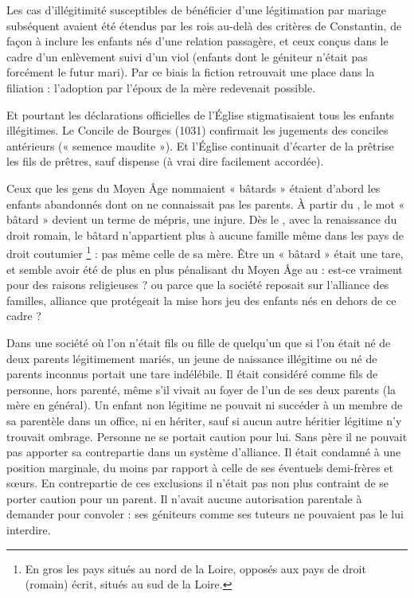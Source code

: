  Les cas d'illégitimité susceptibles de bénéficier d'une légitimation par mariage subséquent avaient été étendus par les rois au-delà des critères de Constantin, de façon à inclure les enfants nés d'une relation passagère, et ceux conçus dans le cadre d'un enlèvement suivi d'un viol (enfants dont le géniteur n'était pas forcément le futur mari). Par ce biais la fiction retrouvait une place dans la filiation : l'adoption par l'époux de la mère redevenait possible. 

 Et pourtant les déclarations officielles de l'Église stigmatisaient tous les enfants illégitimes. Le Con\-ci\-le de Bourges (1031) confirmait les jugements des conciles antérieurs (« semence maudite »). Et l'Église continuait d'écarter de la prêtrise les fils de prêtres, sauf dispense (à vrai dire facilement accordée). 



 Ceux que les gens du Moyen Âge nommaient « bâtards » étaient d'abord les enfants abandonnés dont on ne connaissait pas les parents. À partir du , le mot « bâtard » devient un terme de mépris, une injure. Dès le , avec la renaissance du droit romain, le bâtard n'appartient plus à aucune famille même dans les pays de droit coutumier%
\footnote{En gros les pays situés au nord de la Loire, opposés aux pays de droit (romain) écrit, situés au sud de la Loire.} 
: pas même celle de sa mère. Être un « bâtard » était une tare, et semble avoir été de plus en plus pénalisant du Moyen Âge au  : est-ce vraiment pour des raisons religieuses ? ou parce que la société reposait sur l'alliance des familles, alliance que protégeait la mise hors jeu des enfants nés en dehors de ce cadre ?

 Dans une société où l'on n'était fils ou fille de quelqu'un que si l'on était né de deux parents légitimement mariés, un jeune de naissance illégitime ou né de parents inconnus portait une tare indélébile. Il était considéré comme fils de personne, hors parenté, même s'il vivait au foyer de l'un de ses deux parents (la mère en général). Un enfant non légitime ne pouvait ni succéder à un membre de sa parentèle dans un office, ni en hériter, sauf si aucun autre héritier légitime n'y trouvait ombrage. Personne ne se portait caution pour lui. Sans père il ne pouvait pas apporter sa contrepartie dans un système d'alliance. Il était condamné à une position marginale, du moins par rapport à celle de ses éventuels demi-frères et sœurs. En contrepartie de ces exclusions il n'était pas non plus contraint de se porter caution pour un parent. Il n'avait aucune autorisation parentale à demander pour convoler : ses géniteurs comme ses tuteurs ne pouvaient pas le lui interdire.

